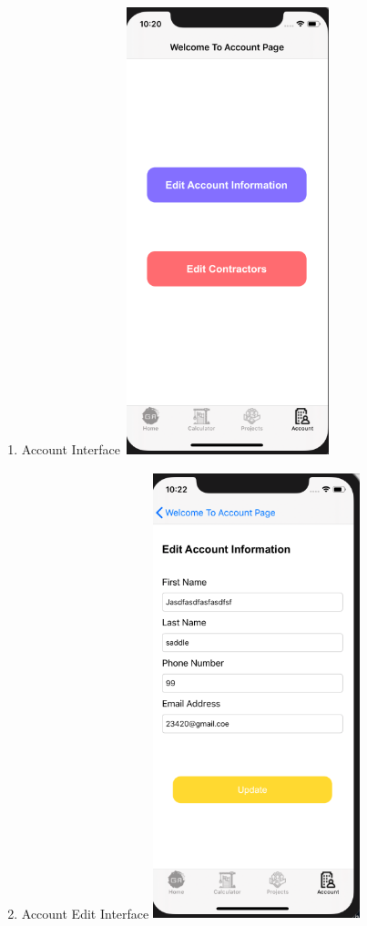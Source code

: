 \documentclass[onecolumn, draftclsnofoot,10pt, compsoc]{IEEEtran}
\begin{document}
\begin{enumerate}
  \newpage
      \item Account Interface\newline\newline
  \includegraphics[width=6cm, height=13cm]{ios-account.png}\newline
  \newpage
     \item Account Edit Interface\newline\newline
  \includegraphics[width=6cm, height=13cm]{ios-edit-account.png}\newline

\end{enumerate}
\end{document}
